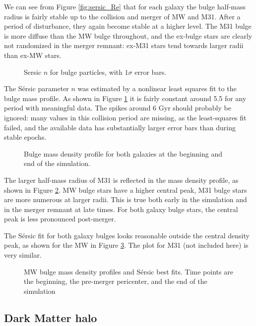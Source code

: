 \documentclass[twocolumn]{aastex63}
\begin{document}
We can see from Figure \ref{fig:sersic_Re} that for each galaxy the bulge half-mass radius is fairly stable up to the collision and merger of MW and M31. After a period of disturbance, they again become stable at a higher level. The M31 bulge is more diffuse than the MW bulge throughout, and the ex-bulge stars are clearly not randomized in the merger remnant: ex-M31 stars tend towards larger radii than ex-MW stars.

\begin{figure}[bht!]
	\caption{Sersic $n$ for bulge particles, with $1\sigma$ error bars.
		\label{fig:sersic_n}}
\end{figure}

The Sérsic parameter $n$ was estimated by a nonlinear least squares fit to the bulge mass profile. As shown in Figure \ref{fig:sersic_n} it is fairly constant around 5.5 for any period with meaningful data. The spikes around 6 Gyr should probably be ignored: many values in this collision period are missing, as the least-squares fit failed, and the available data has substantially larger error bars than during stable epochs.

\begin{figure}[bht!]
	\caption{Bulge mass density profile for both galaxies at the beginning and end of the simulation.
		\label{fig:bulge_mp}}
\end{figure}

The larger half-mass radius of M31 is reflected in the mass density profile, as shown in Figure \ref{fig:bulge_mp}. MW bulge stars have a higher central peak, M31 bulge stars are more numerous at larger radii. This is true both early in the simulation and in the merger remnant at late times. For both galaxy bulge stars, the central peak is less pronounced post-merger.

The Sérsic fit for both galaxy bulges looks reasonable outside the central density peak, as shown for the MW in Figure \ref{fig:MW_bulge_sersic}. The plot for M31 (not included here) is very  similar.

\begin{figure}[bht!]
	\caption{MW bulge mass density profiles and Sérsic best fits. Time points are the beginning, the pre-merger pericenter, and the end of the simulation
		\label{fig:MW_bulge_sersic}}
\end{figure}

\subsection{Dark Matter halo}
\end{document}
